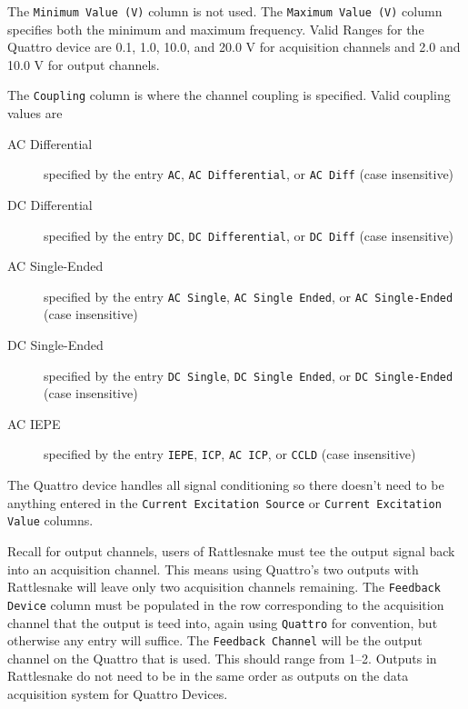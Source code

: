 \documentclass[pdf,12pt,report]{SANDreport}
\newcommand{\inlineCode}{\lstinline[basicstyle=\bfseries\ttfamily]}
\begin{document}
    The \inlineCode{Minimum Value (V)} column is not used.  The \inlineCode{Maximum Value (V)} column specifies both the minimum and maximum frequency.  Valid Ranges for the Quattro device are 0.1, 1.0, 10.0, and 20.0 V for acquisition channels and 2.0 and 10.0 V for output channels.
    
    The \inlineCode{Coupling} column is where the channel coupling is specified.  Valid coupling values are
    \begin{description}
        \item[AC Differential] specified by the entry \inlineCode{AC}, \inlineCode{AC Differential}, or \inlineCode{AC Diff} (case insensitive)
        \item[DC Differential] specified by the entry \inlineCode{DC}, \inlineCode{DC Differential}, or \inlineCode{DC Diff} (case insensitive)
        \item[AC Single-Ended] specified by the entry \inlineCode{AC Single}, \inlineCode{AC Single Ended}, or \inlineCode{AC Single-Ended} (case insensitive)
        \item[DC Single-Ended] specified by the entry \inlineCode{DC Single}, \inlineCode{DC Single Ended}, or \inlineCode{DC Single-Ended} (case insensitive)
        \item[AC IEPE] specified by the entry \inlineCode{IEPE}, \inlineCode{ICP}, \inlineCode{AC ICP}, or \inlineCode{CCLD} (case insensitive)
    \end{description}

    The Quattro device handles all signal conditioning so there doesn't need to be anything entered in the \inlineCode{Current Excitation Source} or \inlineCode{Current Excitation Value} columns.  

    Recall for output channels, users of Rattlesnake must tee the output signal back into an acquisition channel.  This means using Quattro's two outputs with Rattlesnake will leave only two acquisition channels remaining.  The \inlineCode{Feedback Device} column must be populated in the row corresponding to the acquisition channel that the output is teed into, again using \inlineCode{Quattro} for convention, but otherwise any entry will suffice.  The \inlineCode{Feedback Channel} will be the output channel on the Quattro that is used.  This should range from 1--2.  Outputs in Rattlesnake do not need to be in the same order as outputs on the data acquisition system for Quattro Devices.
    
\end{document}
